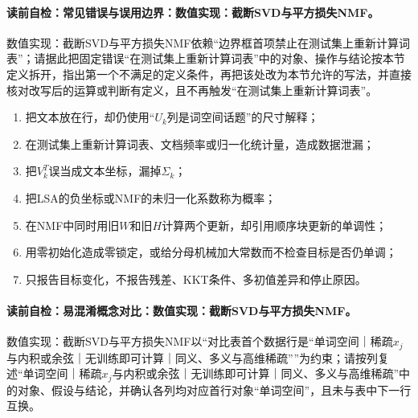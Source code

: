 \label{struct:V4-C05-CH30}
\paragraph{读前自检：常见错误与误用边界：数值实现：截断SVD与平方损失NMF。}数值实现：截断SVD与平方损失NMF依赖“边界框首项禁止在测试集上重新计算词表”；请据此把固定错误“在测试集上重新计算词表”中的对象、操作与结论按本节定义拆开，指出第一个不满足的定义条件，再把该处改为本节允许的写法，并直接核对改写后的运算或判断有定义，且不再触发“在测试集上重新计算词表”。\par

\begin{warningbox}
\begin{enumerate}[leftmargin=2.2em]
  \item 把文本放在行，却仍使用“$U_k$列是词空间话题”的尺寸解释；
  \item 在测试集上重新计算词表、文档频率或归一化统计量，造成数据泄漏；
  \item 把$V_k^T$误当成文本坐标，漏掉$\Sigma_k$；
  \item 把LSA的负坐标或NMF的未归一化系数称为概率；
  \item 在NMF中同时用旧$W$和旧$H$计算两个更新，却引用顺序块更新的单调性；
  \item 用零初始化造成零锁定，或给分母机械加大常数而不检查目标是否仍单调；
  \item 只报告目标变化，不报告残差、KKT条件、多初值差异和停止原因。
\end{enumerate}
\end{warningbox}

\label{struct:V4-C05-CH31}
\paragraph{读前自检：易混淆概念对比：数值实现：截断SVD与平方损失NMF。}数值实现：截断SVD与平方损失NMF以“对比表首个数据行是“单词空间｜稀疏$x_j$与内积或余弦｜无训练即可计算｜同义、多义与高维稀疏””为约束；请按列复述“单词空间｜稀疏$x_j$与内积或余弦｜无训练即可计算｜同义、多义与高维稀疏”中的对象、假设与结论，并确认各列均对应首行对象“单词空间”，且未与表中下一行互换。\par

